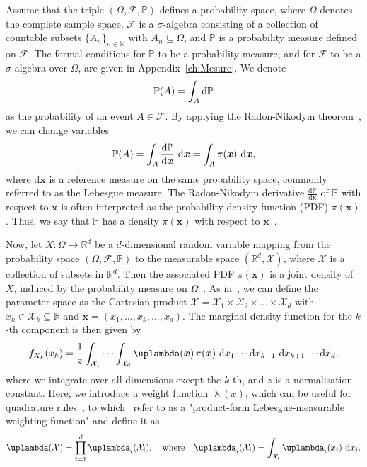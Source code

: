 Assume that the triple $(\Omega, \mathcal{F}, \mathbb{P})$ defines a probability space, where $\Omega$ denotes the complete sample space, $\mathcal{F}$ is a $\sigma$-algebra consisting of a collection of countable subsets $\{A_n\}_{n \in \mathbb{N}}$ with $A_n \subseteq \Omega$, and $\mathbb{P}$ is a probability measure defined on $\mathcal{F}$. The formal conditions for $\mathbb{P}$ to be a probability measure, and for $\mathcal{F}$ to be a $\sigma$-algebra over $\Omega$, are given in Appendix~\ref{ch:Mesure}.
We denote
\begin{align}
	\mathbb{P}(A) = \int_A \mathop{}\!\mathrm{d}  \mathbb{P}
\end{align}
as the probability of an event $A \in \mathcal{F}$.
By applying the Radon-Nikodym theorem~\cite{kopp2004measintprob}, we can change variables
\begin{align}
	\mathbb{P}(A) = \int_A \frac{\mathop{}\!\mathrm{d} \mathbb{P}}{\mathop{}\!\mathrm{d} \bm{x}} \, \mathop{}\!\mathrm{d} \bm{x} = \int_A \pi(\bm{x}) \, \mathop{}\!\mathrm{d} \bm{x},
\end{align}
where $\mathrm{d}\bm{x}$ is a reference measure on the same probability space, commonly referred to as the Lebesgue measure. 
The Radon-Nikodym derivative $\frac{\mathrm{d} \mathbb{P}}{\mathrm{d}\bm{x}}$ of $\mathbb{P}$ with respect to $\bm{x}$ is often interpreted as the probability density function (PDF) $\pi(\bm{x})$. Thus, we say that $\mathbb{P}$ has a density $\pi(\bm{x})$ with respect to $\bm{x}$~\cite[Chapter 10]{simonnet1996measprob}.

Now, let $X: \Omega \longrightarrow \mathbb{R}^d$ be a $d$-dimensional random variable mapping from the probability space $(\Omega, \mathcal{F}, \mathbb{P})$ to the measurable space $(\mathbb{R}^d, \mathcal{X})$, where $\mathcal{X}$ is a collection of subsets in $\mathbb{R}^d$.
Then the associated PDF $\pi(\bm{x})$ is a joint density of $X$, induced by the probability measure on $\Omega$~\cite{VesaInvLect, kopp2004measintprob}.
As in~\cite{cui2022deep}, we can define the parameter space as the Cartesian product $\mathcal{X} = \mathcal{X}_1 \times \mathcal{X}_2 \times \dots \times \mathcal{X}_d$ with $ x_k \in \mathcal{X}_k \subseteq \mathbb{R}$ and $\bm{x} = ( x_1,\dots ,x_k,\dots,x_d )$.
The marginal density function for the $k$-th component is then given by
\begin{align}
	f_{X_k}(x_k) = \frac{1}{z} \int_{\mathcal{X}_1} \cdots \int_{\mathcal{X}_d} \uplambda(\bm{x}) \, \pi(\bm{x}) \, \diff x_1 \cdots \diff x_{k-1} \, \diff x_{k+1} \cdots \diff x_d, \label{eq:margInt}
\end{align}
where we integrate over all dimensions except the $k$-th, and $z$ is a normalisation constant.
Here, we introduce a weight function $\uplambda(x)$, which can be useful for quadrature rules~\cite{davis2007methods}, to which~\cite{cui2022deep} refer to as a "product-form Lebesgue-measurable weighting function" and define it as
\begin{align}
	\uplambda(\mathcal{X}) = \prod_{i = 1}^{d} \uplambda_i(\mathcal{X}_i), \quad \text{where} \quad \uplambda_i(\mathcal{X}_i) = \int_{\mathcal{X}_i} \uplambda_i(x_i) \, \diff x_i. \label{eq:lebesgueWeight}
\end{align}


